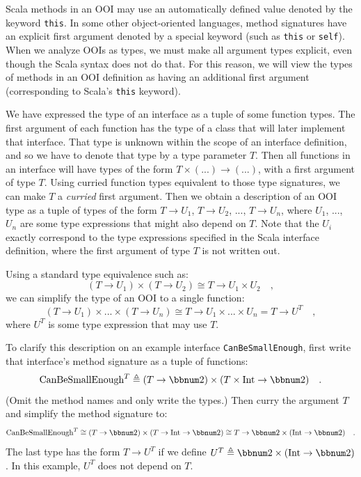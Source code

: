 Scala methods in an OOI may use an automatically defined value denoted
by the keyword \lstinline!this!. In some other object-oriented languages,
method signatures have an explicit first argument denoted by a special
keyword (such as \lstinline!this! or \lstinline!self!). When we
analyze OOIs as types, we must make all argument types explicit, even
though the Scala syntax does not do that. For this reason, we will
view the types of methods in an OOI definition as having an additional
first argument (corresponding to Scala\textsf{'}s \lstinline!this! keyword).

We have expressed the type of an interface as a tuple of some function
types. The first argument of each function has the type of a class
that will later implement that interface. That type is unknown within
the scope of an interface definition, and so we have to denote that
type by a type parameter $T$. Then all functions in an interface
will have types of the form $T\times(...)\rightarrow(...)$, with
a first argument of type $T$. Using curried function types equivalent
to those type signatures, we can make $T$ a \emph{curried} first
argument. Then we obtain a description of an OOI type as a tuple of
types of the form $T\rightarrow U_{1}$, $T\rightarrow U_{2}$, ...,
$T\rightarrow U_{n}$, where $U_{1}$, ..., $U_{n}$ are some type
expressions that might also depend on $T$. Note that the $U_{i}$
exactly correspond to the type expressions specified in the Scala
interface definition, where the first argument of type $T$ is not
written out.

Using a standard type equivalence such as:
\[
(T\rightarrow U_{1})\times(T\rightarrow U_{2})\cong T\rightarrow U_{1}\times U_{2}\quad,
\]
we can simplify the type of an OOI to a single function:
\[
(T\rightarrow U_{1})\times...\times(T\rightarrow U_{n})\cong T\rightarrow U_{1}\times...\times U_{n}=T\rightarrow U^{T}\quad,
\]
where $U^{T}$ is some type expression that may use $T$. 

To clarify this description on an example interface \lstinline!CanBeSmallEnough!,
first write that interface\textsf{'}s method signature as a tuple of functions:
\[
\text{CanBeSmallEnough}^{T}\triangleq(T\rightarrow\bbnum 2)\times(T\times\text{Int}\rightarrow\bbnum 2)\quad.
\]
(Omit the method names and only write the types.) Then curry the argument
$T$ and simplify the method signature to:
\[
\text{CanBeSmallEnough}^{T}\cong(T\rightarrow\bbnum 2)\times(T\rightarrow\text{Int}\rightarrow\bbnum 2)\cong T\rightarrow\bbnum 2\times(\text{Int}\rightarrow\bbnum 2)\quad.
\]
The last type has the form $T\rightarrow U^{T}$ if we define $U^{T}\triangleq\bbnum 2\times(\text{Int}\rightarrow\bbnum 2)$.
In this example, $U^{T}$ does not depend on $T$.

